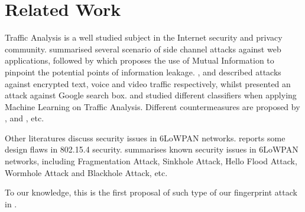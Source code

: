 \section{Related Work \label{RelatedWork}}
Traffic Analysis is a well studied subject in the Internet security and privacy community. \cite{WebSidechannel} summarised several scenario of side channel attacks against web applications, followed by \cite{PinpointWeb} which proposes the use of Mutual Information to pinpoint the potential points of information leakage. \cite{AppleMsg}, \cite{Language} and \cite{VideoTraffic} described attacks against encrypted text, voice and video traffic respectively, whilst \cite{SuggestBox} presented an attack against Google search box. \cite{HClassifier} and \cite{Peekaboo} studied different classifiers when applying Machine Learning on Traffic Analysis. Different countermeasures are proposed by \cite{TrafficMorphing}, \cite{HTTPOS} and \cite{FTE}, etc.

Other literatures discuss security issues in 6LoWPAN networks. \cite{802154SecIssues} reports some design flaws in 802.15.4 security. \cite{6LoWPANAtk} summarises known security issues in 6LoWPAN networks, including Fragmentation Attack\cite{FragAtk}, Sinkhole Attack\cite{Sinkhole}, Hello Flood Attack\cite{HelloFlood}, Wormhole Attack\cite{Wormhole} and Blackhole Attack\cite{Blackhole}, etc.

To our knowledge, this is the first proposal of such type of our fingerprint attack in .
